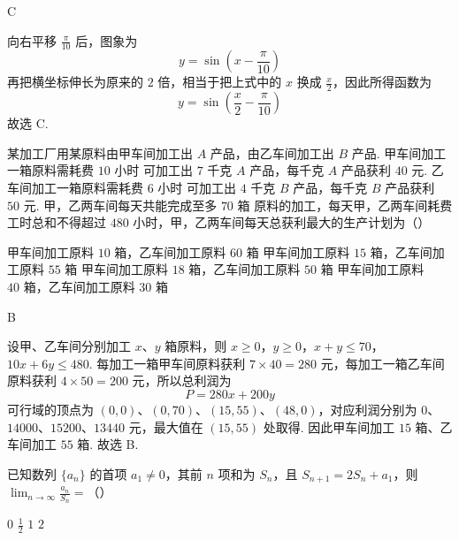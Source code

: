 \begin{answer}
C
\end{answer}

\begin{solution}
向右平移 \(\frac{\pi}{10}\) 后，图象为
\[
y=\sin\left(x-\frac{\pi}{10}\right)
\]
再把横坐标伸长为原来的 \(2\) 倍，相当于把上式中的 \(x\) 换成 \(\frac{x}{2}\)，因此所得函数为
\[
y=\sin\left(\frac{x}{2}-\frac{\pi}{10}\right)
\]
故选 C.
\end{solution}

\begin{problem}
某加工厂用某原料由甲车间加工出 \(A\) 产品，由乙车间加工出 \(B\) 产品. 甲车间加工一箱原料需耗费 \(10\text{ 小时}\) 可加工出 \(7\text{ 千克}\) \(A\) 产品，每千克 \(A\) 产品获利 \(40\text{ 元}\). 乙车间加工一箱原料需耗费 \(6\text{ 小时}\) 可加工出 \(4\text{ 千克}\) \(B\) 产品，每千克 \(B\) 产品获利 \(50\text{ 元}\). 甲，乙两车间每天共能完成至多 \(70\text{ 箱}\) 原料的加工，每天甲，乙两车间耗费工时总和不得超过 \(480\text{ 小时}\)，甲，乙两车间每天总获利最大的生产计划为（\quad）

\choices
    {甲车间加工原料 \(10\text{ 箱}\)，乙车间加工原料 \(60\text{ 箱}\)}
    {甲车间加工原料 \(15\text{ 箱}\)，乙车间加工原料 \(55\text{ 箱}\)}
    {甲车间加工原料 \(18\text{ 箱}\)，乙车间加工原料 \(50\text{ 箱}\)}
    {甲车间加工原料 \(40\text{ 箱}\)，乙车间加工原料 \(30\text{ 箱}\)}
\end{problem}

\begin{answer}
B
\end{answer}

\begin{solution}
设甲、乙车间分别加工 \(x\)、\(y\) 箱原料，则
\(x\geq0\)，\(y\geq0\)，\(x+y\leq70\)，\(10x+6y\leq480\).
每加工一箱甲车间原料获利 \(7\times40=280\) 元，每加工一箱乙车间原料获利 \(4\times50=200\) 元，所以总利润为
\[
P=280x+200y
\]
可行域的顶点为 \((0,0)\)、\((0,70)\)、\((15,55)\)、\((48,0)\)，对应利润分别为 \(0\)、\(14000\)、\(15200\)、\(13440\) 元，最大值在 \((15,55)\) 处取得.
因此甲车间加工 \(15\) 箱、乙车间加工 \(55\) 箱.
故选 B.
\end{solution}

\begin{problem}
已知数列 \( \{a_{n}\} \) 的首项 \( a_{1} \neq 0 \)，其前 \(n\) 项和为 \( S_{n} \)，且 \( S_{n+1} = 2S_{n} + a_{1} \)，则 \( \displaystyle\lim_{n \to \infty} \frac{a_{n}}{S_{n}} = \)（\quad）

\choices
    {\(0\)}
    {\( \frac{1}{2} \)}
    {\(1\)}
    {\(2\)}
\end{problem}

